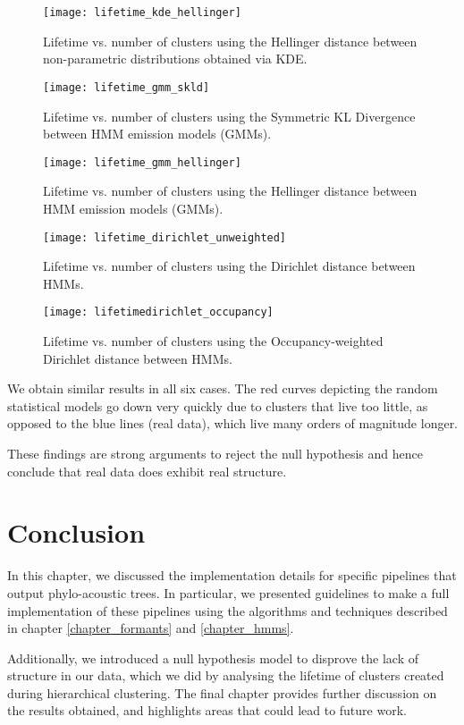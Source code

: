\documentclass[../main.tex]{subfiles}
\begin{document}
\begin{figure}[H]
\centering
\texttt{[image: lifetime\_kde\_hellinger]}
\caption{Lifetime vs. number of clusters using the Hellinger distance between non-parametric distributions obtained via KDE.}
\label{fig_lt_kde_hellinger}
\end{figure}

\begin{figure}[H]
\centering
\texttt{[image: lifetime\_gmm\_skld]}
\caption{Lifetime vs. number of clusters using the Symmetric KL Divergence between HMM emission models (GMMs).}
\label{fig_lt_gmm_skld}
\end{figure}

\begin{figure}[H]
\centering
\texttt{[image: lifetime\_gmm\_hellinger]}
\caption{Lifetime vs. number of clusters using the Hellinger distance between HMM emission models (GMMs).}
\label{fig_lt_gmm_hellinger}
\end{figure}

\begin{figure}[H]
\centering
\texttt{[image: lifetime\_dirichlet\_unweighted]}
\caption{Lifetime vs. number of clusters using the Dirichlet distance between HMMs.}
\label{fig_lt_du}
\end{figure}

\begin{figure}[H]
\centering
\texttt{[image: lifetimedirichlet\_occupancy]}
\caption{Lifetime vs. number of clusters using the Occupancy-weighted Dirichlet distance between HMMs.}
\label{fig_lt_occ}
\end{figure}   


\par We obtain similar results in all six cases. The red curves depicting the random statistical models go down very quickly due to clusters that live too little, as opposed to the blue lines (real data), which live many orders of magnitude longer.
\par These findings are strong arguments to reject the null hypothesis and hence conclude that real data does exhibit real structure.
\section{Conclusion}
In this chapter, we discussed the implementation details for specific pipelines that output phylo-acoustic trees. In particular, we presented guidelines to make a full implementation of these pipelines using the algorithms and techniques described in chapter \ref{chapter_formants} and \ref{chapter_hmms}.
\par Additionally, we introduced a null hypothesis model to disprove the lack of structure in our data, which we did by analysing the lifetime of clusters created during hierarchical clustering. The final chapter provides further discussion on the results obtained, and highlights areas that could lead to future work.
\end{document}

